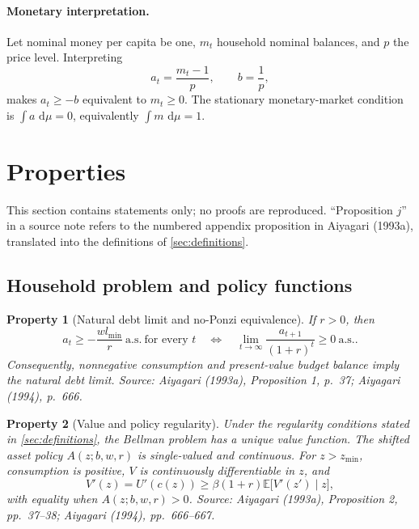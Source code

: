 \documentclass[11pt]{article}
\theoremstyle{propertystyle}
\newtheorem{property}{Property}
\newcommand{\E}{\mathbb{E}}
\newcommand{\1}{\mathbf{1}}
\newcommand{\dd}{\,\mathrm{d}}
\newcommand{\as}{\text{a.s.}}
\begin{document}
\paragraph{Monetary interpretation.}
Let nominal money per capita be one, $m_t$ household nominal balances, and $p$
the price level.  Interpreting
\begin{equation}
  a_t=\frac{m_t-1}{p},
  \qquad b=\frac1p,
  \label{eq:money-map}
\end{equation}
makes $a_t\geq-b$ equivalent to $m_t\geq0$.  The stationary monetary-market
condition is $\int a\,\dd\mu=0$, equivalently $\int m\,\dd\mu=1$.

\section{Properties}
\label{sec:properties}

This section contains statements only; no proofs are reproduced.  ``Proposition
$j$'' in a source note refers to the numbered appendix proposition in Aiyagari
(1993a), translated into the definitions of \cref{sec:definitions}.

\subsection{Household problem and policy functions}

\begin{property}[Natural debt limit and no-Ponzi equivalence]
If $r>0$, then
\[
  a_t\geq-\frac{wl_{\min}}r\ \as\ \text{for every }t
  \quad\Longleftrightarrow\quad
  \lim_{t\to\infty}\frac{a_{t+1}}{(1+r)^t}\geq0\ \as.
\]
Consequently, nonnegative consumption and present-value budget balance imply
the natural debt limit.  \emph{Source: Aiyagari (1993a), Proposition 1,
p.~37; Aiyagari (1994), p.~666.}
\end{property}

\begin{property}[Value and policy regularity]
Under the regularity conditions stated in \cref{sec:definitions}, the Bellman
problem has a unique value function.  The shifted asset policy $A(z;b,w,r)$ is
single-valued and continuous.  For $z>z_{\min}$, consumption is positive,
$V$ is continuously differentiable in $z$, and
\[
  V'(z)=U'(c(z))
  \geq
  \beta(1+r)\E\bigl[V'(z')\mid z\bigr],
\]
with equality when $A(z;b,w,r)>0$.  \emph{Source: Aiyagari (1993a),
Proposition 2, pp.~37--38; Aiyagari (1994), pp.~666--667.}
\end{property}
\end{document}
